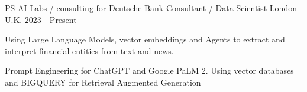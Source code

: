 


\begin{cventries}





\cventry
{PS AI Labs / consulting for Deutsche Bank} %
{Consultant / Data Scientist} %
{London - U.K.} %
{2023 - Present} %
{ %
\begin{cvitems}
\item {Using Large Language Models, vector embeddings and Agents to extract and interpret financial entities from text and news.}
\item {Prompt Engineering for ChatGPT and Google PaLM 2. Using vector databases and BIGQUERY for Retrieval Augmented Generation}
\end{cvitems}
}


\end{cventries}

